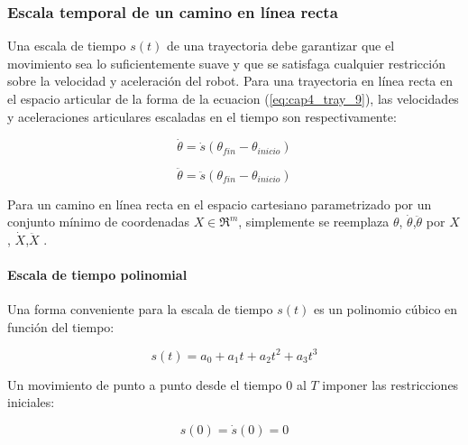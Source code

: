         \newpage

            
            
            
        \subsubsection{Escala temporal de un camino en línea recta}
            Una escala de tiempo $s(t)$ de una trayectoria debe garantizar que el movimiento sea lo suficientemente suave y que se satisfaga cualquier restricción sobre la velocidad y aceleración del robot. Para una trayectoria en línea recta en el espacio articular de la forma de la ecuacion (\ref{eq:cap4_tray_9}), las velocidades y aceleraciones articulares escaladas en el tiempo son respectivamente:
        
        
            \begin{equation}
                \dot{\theta}=\dot{s} (\theta_{fin}-\theta_{inicio})
                \label{eq:cap4_tray_13}
             \end{equation}      
             
            \begin{equation}
                \ddot{\theta}=\ddot{s} (\theta_{fin}-\theta_{inicio})
                \label{eq:cap4_tray_14}
             \end{equation}  
        
    Para un camino en línea recta en el espacio cartesiano parametrizado por un conjunto mínimo de coordenadas $X\in{\Re}^m$, simplemente se reemplaza $\theta$, $\dot{\theta}$,$\ddot{\theta}$ por $X$, $\dot{X}$,$\ddot{X}$ .        
        
        \paragraph{Escala de tiempo polinomial}
        
            Una forma conveniente para la escala de tiempo $s(t)$ es un polinomio cúbico en función del tiempo: 
            
            \begin{equation}
                s(t)= a_{0}+a_{1}t+a_{2}t^{2}+a_{3}t^{3}
                \label{eq:cap4_tray_15}
             \end{equation}     
        
            Un movimiento de punto a punto desde el tiempo $0$ al  $T$ imponer las restricciones iniciales:
        
            \begin{equation}
                s(0)= \dot{s}(0) = 0 
                \label{eq:cap4_tray_16}
             \end{equation} 
             
